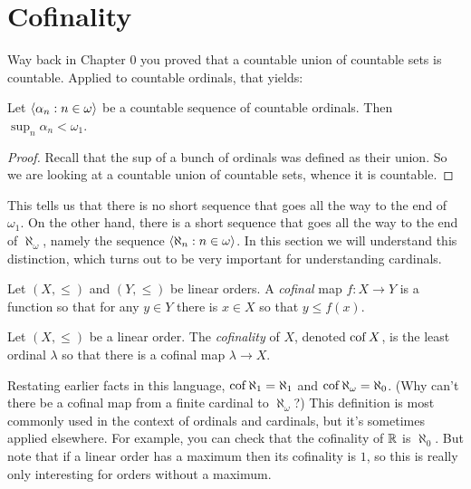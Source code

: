 \documentclass[10pt]{amsart}
\begin{document}
\newpage

\section{Cofinality}

Way back in Chapter 0 you proved that a countable union of countable sets is countable. Applied to countable ordinals, that yields:

\begin{proposition}
Let ${\left\langle \alpha_n : n \in \omega \right\rangle}$ be a countable sequence of countable ordinals. Then $\sup_n \alpha_n < \omega_1$.
\end{proposition}

\begin{proof}
Recall that the sup of a bunch of ordinals was defined as their union. So we are looking at a countable union of countable sets, whence it is countable. 
\end{proof}

This tells us that there is no short sequence that goes all the way to the end of $\omega_1$. On the other hand, there is a short sequence that goes all the way to the end of $\aleph_\omega$, namely the sequence ${\left\langle \aleph_n : n \in \omega \right\rangle}$. In this section we will understand this distinction, which turns out to be very important for understanding cardinals.

\begin{definition}
Let $(X,\le)$ and $(Y,\le)$ be linear orders. A \emph{cofinal} map $f : X \to Y$ is a function so that for any $y \in Y$ there is $x \in X$ so that $y \le f(x)$.
\end{definition}

\begin{definition}
Let $(X,\le)$ be a linear order. The \emph{cofinality} of $X$, denoted $\operatorname{cof} X$, is the least ordinal $\lambda$ so that there is a cofinal map $\lambda \to X$.
\end{definition}

Restating earlier facts in this language, $\operatorname{cof} \aleph_1 = \aleph_1$ and $\operatorname{cof} \aleph_\omega = \aleph_0$. (Why can't there be a cofinal map from a finite cardinal to $\aleph_\omega$?)
This definition is most commonly used in the context of ordinals and cardinals, but it's sometimes applied elsewhere. For example, you can check that the cofinality of $\mathbb{R}$ is $\aleph_0$. But note that if a linear order has a maximum then its cofinality is $1$, so this is really only interesting for orders without a maximum.
\end{document}

